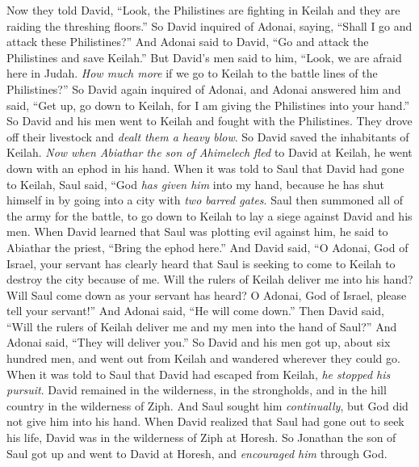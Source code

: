 \begin{biblechapter} %
 Now they told David, “Look, the Philistines are fighting in Keilah and they are raiding the threshing floors.”
\verse So David inquired of Adonai, saying, “Shall I go and attack these Philistines?” And Adonai said to David, “Go and attack the Philistines and save Keilah.”
\verse But David’s men said to him, “Look, we are afraid here in Judah. \textit{How much more} if we go to Keilah to the battle lines of the Philistines?”
\verse So David again inquired of Adonai, and Adonai answered him and said, “Get up, go down to Keilah, for I am giving the Philistines into your hand.”
\verse So David and his men went to Keilah and fought with the Philistines. They drove off their livestock and \textit{dealt them a heavy blow}. So David saved the inhabitants of Keilah.
 \textit{Now when Abiathar the son of Ahimelech fled} to David at Keilah, he went down with an ephod in his hand.
\verse When it was told to Saul that David had gone to Keilah, Saul said, “God \textit{has given him} into my hand, because he has shut himself in by going into a city with \textit{two barred gates}.
\verse Saul then summoned all of the army for the battle, to go down to Keilah to lay a siege against David and his men.
\verse When David learned that Saul was plotting evil against him, he said to Abiathar the priest, “Bring the ephod here.”
\verse And David said, “O Adonai, God of Israel, your servant has clearly heard that Saul is seeking to come to Keilah to destroy the city because of me.
\verse Will the rulers of Keilah deliver me into his hand? Will Saul come down as your servant has heard? O Adonai, God of Israel, please tell your servant!” And Adonai said, “He will come down.”
\verse Then David said, “Will the rulers of Keilah deliver me and my men into the hand of Saul?” And Adonai said, “They will deliver you.”
\verse So David and his men got up, about six hundred men, and went out from Keilah and wandered wherever they could go. When it was told to Saul that David had escaped from Keilah, \textit{he stopped his pursuit}.
 David remained in the wilderness, in the strongholds, and in the hill country in the wilderness of Ziph. And Saul sought him \textit{continually}, but God did not give him into his hand.
\verse When David realized that Saul had gone out to seek his life, David was in the wilderness of Ziph at Horesh.
\verse So Jonathan the son of Saul got up and went to David at Horesh, and \textit{encouraged him} through God.

\end{biblechapter}
